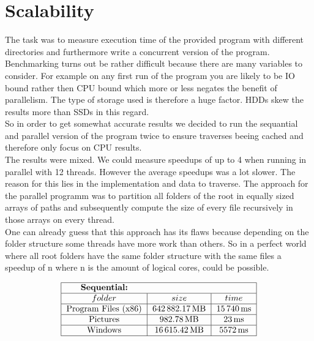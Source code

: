 \documentclass{article}
\begin{document}
  \section{Scalability}
    The task was to measure execution time of the provided program with different directories and furthermore write a concurrent version of the program.
    \\[3pt]
    Benchmarking turns out be rather difficult because there are many variables to consider. For example on any first run of the program you are likely to be IO bound rather then CPU bound which more or less negates the benefit of parallelism. The type of storage used is therefore a huge factor. HDDs skew the results more than SSDs in this regard.
    \\[3pt]
    So in order to get somewhat accurate results we decided to run the sequantial and parallel version of the program twice to ensure traverses beeing cached and therefore only focus on CPU results.
    \\[3pt]
    The results were mixed. We could measure speedups of up to 4 when running in parallel with 12 threads. However the average speedups was a lot slower. The reason for this lies in the implementation and data to traverse. The approach for the parallel programm was to partition all folders of the root in equally sized arrays of paths and subsequently compute the size of every file recursively in those arrays on every thread.
    \\[3pt]
    One can already guess that this approach has its flaws because depending on the folder structure some threads have more work than others. So in a perfect world where all root folders have the same folder structure with the same files a speedup of n where n is the amount of logical cores, could be possible.
    \\[24pt]
    \begin{doublespacing}
      \begin{align*}
        \begin{tabular}{|*{3}{c|}}
          \hline
          \multicolumn{1}{|c}{\bfseries Sequential:} & \multicolumn{1}{c}{} & \multicolumn{1}{c|}{} \\
          \hline
          $folder$ & $size$ & $time$ \\
          \hline
          Program Files (x86) & $\SI{642882.17}{\mega\byte}$ & $\SI{15740}{\milli\second}$ \\
          \hline
          Pictures & $\SI{982.78}{\mega\byte}$ & $\SI{23}{\milli\second}$ \\
          \hline
          Windows & $\SI{16615.42}{\mega\byte}$ & $\SI{5572}{\milli\second}$ \\
          \hline
        \end{tabular}
      \end{align*}
    \end{doublespacing}
\end{document}
